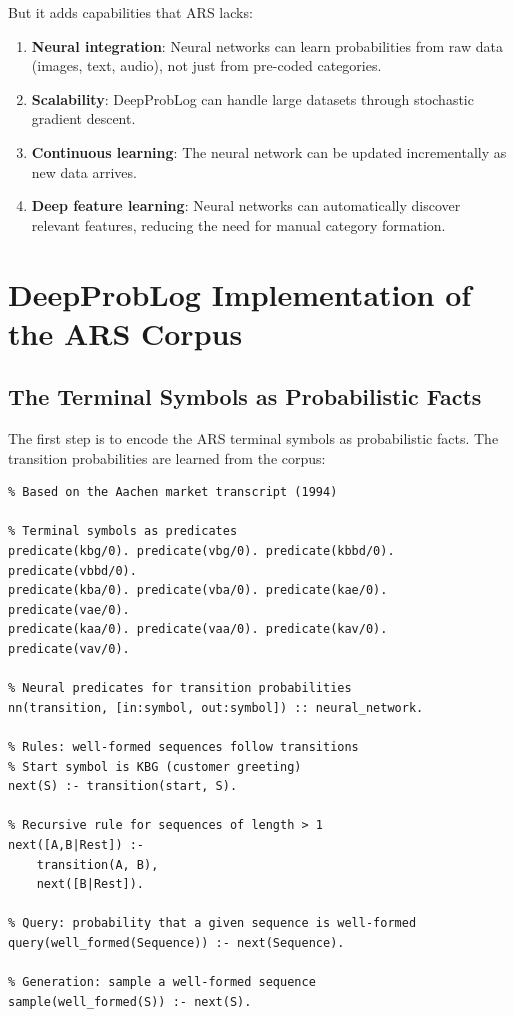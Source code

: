 \documentclass[12pt,a4paper]{article}
\begin{document}
But it adds capabilities that ARS lacks:

\begin{enumerate}
    \item \textbf{Neural integration}: Neural networks can learn probabilities 
    from raw data (images, text, audio), not just from pre-coded categories.
    
    \item \textbf{Scalability}: DeepProbLog can handle large datasets through 
    stochastic gradient descent.
    
    \item \textbf{Continuous learning}: The neural network can be updated 
    incrementally as new data arrives.
    
    \item \textbf{Deep feature learning}: Neural networks can automatically 
    discover relevant features, reducing the need for manual category formation.
\end{enumerate}

\section{DeepProbLog Implementation of the ARS Corpus}

\subsection{The Terminal Symbols as Probabilistic Facts}

The first step is to encode the ARS terminal symbols as probabilistic facts. 
The transition probabilities are learned from the corpus:

\begin{lstlisting}[caption=DeepProbLog Encoding of ARS Grammar]
% DeepProbLog implementation of ARS grammar for sales conversations
% Based on the Aachen market transcript (1994)

% Terminal symbols as predicates
predicate(kbg/0). predicate(vbg/0). predicate(kbbd/0). predicate(vbbd/0).
predicate(kba/0). predicate(vba/0). predicate(kae/0). predicate(vae/0).
predicate(kaa/0). predicate(vaa/0). predicate(kav/0). predicate(vav/0).

% Neural predicates for transition probabilities
nn(transition, [in:symbol, out:symbol]) :: neural_network.

% Rules: well-formed sequences follow transitions
% Start symbol is KBG (customer greeting)
next(S) :- transition(start, S).

% Recursive rule for sequences of length > 1
next([A,B|Rest]) :-
    transition(A, B),
    next([B|Rest]).

% Query: probability that a given sequence is well-formed
query(well_formed(Sequence)) :- next(Sequence).

% Generation: sample a well-formed sequence
sample(well_formed(S)) :- next(S).
\end{lstlisting}
\end{document}
